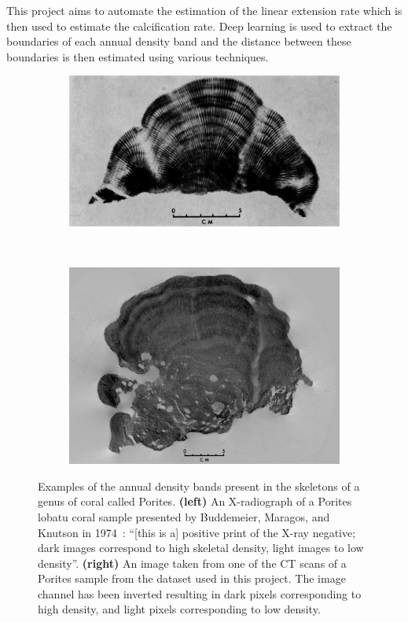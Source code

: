 This project aims to automate the estimation of the linear extension rate which is then used to estimate the calcification rate. Deep learning is used to extract the boundaries of each annual density band and the distance between these boundaries is then estimated using various techniques.

\begin{figure}[t]
    \centering
    \begin{subfigure}[t]{0.49\textwidth}
        \centering
        \includegraphics[width=1\textwidth, valign=c]{images/knutson.jpg}
    \end{subfigure}
    ~
    \begin{subfigure}[t]{0.49\textwidth}
        \centering
        \includegraphics[width=1\textwidth, valign=c]{images/our-coral.png}
    \end{subfigure}
    \caption{Examples of the annual density bands present in the skeletons of a genus of coral called Porites. \textbf{(left)} An X-radiograph of a Porites lobatu coral sample presented by Buddemeier, Maragos, and Knutson in 1974~\cite{coralimage}: ``[this is a] positive print of the X-ray negative; dark images correspond to high skeletal density, light images to low density''. \textbf{(right)} An image taken from one of the CT scans of a Porites sample from the dataset used in this project. The image channel has been inverted resulting in dark pixels corresponding to high density, and light pixels corresponding to low density.}
    \label{fig:densityexample}
\end{figure}

